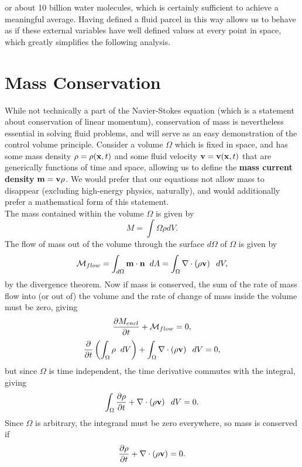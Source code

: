 or about 10 billion water molecules, which is certainly sufficient to achieve a meaningful average. Having defined a fluid parcel in this way allows us to behave as if these external variables have well defined values at every point in space, which greatly simplifies the following analysis. 

\section{Mass Conservation}
While not technically a part of the Navier-Stokes equation (which is a statement about conservation of linear momentum), conservation of mass is nevertheless essential in solving fluid problems, and will serve as an easy demonstration of the control volume principle. Consider a volume $\Omega$ which is fixed in space, and has some mass density $\rho = \rho(\mathbf{x},t)$ and some fluid velocity $\mathbf{v} = \mathbf{v}(\mathbf{x} ,t)$ that are generically functions of time and space, allowing us to define the {\bf mass current density} $\mathbf{m} = \mathbf{v}\rho$. We would prefer that our equations not allow mass to disappear (excluding high-energy physics, naturally), and would additionally prefer a mathematical form of this statement. \\

The mass contained within the volume $\Omega$ is given by 
\begin{equation}
M = \int{\Omega}{}{\rho}{dV}.
\end{equation}
The flow of mass out of the volume through the surface $d\Omega$ of $\Omega$ is given by 
\begin{equation}
\mathcal{M}_{flow} = \int{d\Omega}{}{\Vector{m}\cdot\Vector{n}}{dA} = \int{\Omega}{}{\Div{\paren{\rho\Vector{v}}}}{dV},
\end{equation}
by the divergence theorem.  Now if mass is conserved, the sum of the rate of mass flow into (or out of) the volume and the rate of change of mass inside the volume must be zero, giving
\begin{equation}
\pder{1}{M_{encl}}{t} + \mathcal{M}_{flow} = 0,
\end{equation}
\begin{equation}
\pder{1}{}{t}\paren{\int{\Omega}{}{\rho}{dV}} + \int{\Omega}{}{\Div{\paren{\rho\Vector{v}}}}{dV} =0,
\end{equation}
but since $\Omega$ is time independent, the time derivative commutes with the integral, giving 
\begin{equation}
\int{\Omega}{}{\pder{1}{\rho}{t} + \Div{\paren{\rho\Vector{v}}}}{dV} = 0.
\end{equation}
Since $\Omega$ is arbitrary, the integrand must be zero everywhere, so mass is conserved if
\begin{equation}\label{eq:consMassFull}
\pder{1}{\rho}{t} + \Div{\paren{\rho\Vector{v}} }= 0.
\end{equation}

